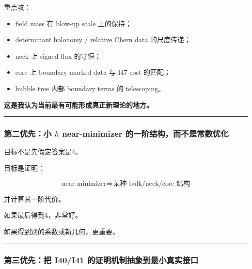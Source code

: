\documentclass[
  10pt,
]{article}
\providecommand{\tightlist}{%
  \setlength{\itemsep}{0pt}\setlength{\parskip}{0pt}}
\begin{document}
重点攻：

\begin{itemize}
\tightlist
\item
  field mass 在 blow-up scale 上的保持；
\item
  determinant holonomy / relative Chern data 的尺度传递；
\item
  neck 上 signed flux 的守恒；
\item
  core 上 boundary marked data 与 I47 cost 的匹配；
\item
  bubble tree 内部 boundary terms 的 telescoping。
\end{itemize}

\textbf{这是我认为当前最有可能形成真正新理论的地方。}

\begin{center}\rule{0.5\linewidth}{0.5pt}\end{center}

\hypertarget{ux7b2cux4e8cux4f18ux5148ux5c0f-h-near-minimizer-ux7684ux4e00ux9636ux7ed3ux6784ux800cux4e0dux662fux5e38ux6570ux4f18ux5316}{%
\subsubsection{\texorpdfstring{第二优先：小 \(h\) near-minimizer
的一阶结构，而不是常数优化}{第二优先：小 h near-minimizer 的一阶结构，而不是常数优化}}\label{ux7b2cux4e8cux4f18ux5148ux5c0f-h-near-minimizer-ux7684ux4e00ux9636ux7ed3ux6784ux800cux4e0dux662fux5e38ux6570ux4f18ux5316}}

目标不是先假定答案是4。

目标是证明：

\[
\text{near minimizer}
\Rightarrow
\text{某种 bulk/neck/core 结构}
\]

并计算其一阶代价。

如果最后得到4，非常好。

如果得到别的系数或新几何，更重要。

\begin{center}\rule{0.5\linewidth}{0.5pt}\end{center}

\hypertarget{ux7b2cux4e09ux4f18ux5148ux628a-i40i41-ux7684ux8bc1ux660eux673aux5236ux62bdux8c61ux5230ux6700ux5c0fux771fux5b9eux63a5ux53e3}{%
\subsubsection{第三优先：把 I40/I41
的证明机制抽象到最小真实接口}\label{ux7b2cux4e09ux4f18ux5148ux628a-i40i41-ux7684ux8bc1ux660eux673aux5236ux62bdux8c61ux5230ux6700ux5c0fux771fux5b9eux63a5ux53e3}}
\end{document}

